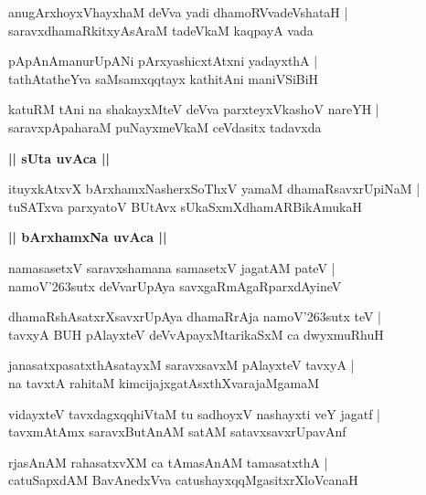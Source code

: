 \documentclass[twoside,12pt,openright]{book}
\def\S{\char'263}
\newcounter{shloka}[chapter]
\def\uvaca#1{\centerline{{\large\textbf{#1}}}}
\begin{document}
\begin{shloka}%
anugArxhoyxVhayxhaM deVva yadi dhamoRVvadeVshataH |\\
saravxdhamaRkitxyAsAraM tadeVkaM kaqpayA vada
\end{shloka}

\begin{shloka}%
pApAnAmanurUpANi pArxyashicxtAtxni yadayxthA |\\
tathAtatheYva saMsamxqqtayx kathitAni maniVSiBiH
\end{shloka}

\begin{shloka}%
katuRM  tAni na shakayxMteV deVva parxteyxVkashoV nareYH |\\
saravxpApaharaM puNayxmeVkaM ceVdasitx tadavxda
\end{shloka}

\uvaca{|| sUta uvAca ||}

\begin{shloka}%
ituyxkAtxvX bArxhamxNasherxSoThxV yamaM dhamaRsavxrUpiNaM |\\
tuSATxva parxyatoV BUtAvx sUkaSxmXdhamARBikAmukaH 
\end{shloka}

\uvaca{|| bArxhamxNa uvAca ||}

\begin{shloka}%
namasasetxV saravxshamana samasetxV jagatAM pateV |\\
namoV\S sutx deVvarUpAya savxgaRmAgaRparxdAyineV 
\end{shloka}

\begin{shloka}%
dhamaRshAsatxrXsavxrUpAya dhamaRrAja namoV\S sutx teV |\\
tavxyA BUH pAlayxteV deVvApayxMtarikaSxM ca dwyxmuRhuH
\end{shloka}

\begin{shloka}%
janasatxpasatxthAsatayxM saravxsavxM pAlayxteV tavxyA |\\
na tavxtA rahitaM kimcijajxgatAsxthXvarajaMgamaM 
\end{shloka}

\begin{shloka}%
vidayxteV tavxdagxqqhiVtaM tu sadhoyxV nashayxti veY jagatf |\\
tavxmAtAmx saravxButAnAM satAM satavxsavxrUpavAnf 
\end{shloka}

\begin{shloka}%
rjasAnAM rahasatxvXM ca tAmasAnAM tamasatxthA |\\
catuSapxdAM BavAnedxVva catushayxqqMgasitxrXloVcanaH 
\end{shloka}
\end{document}
